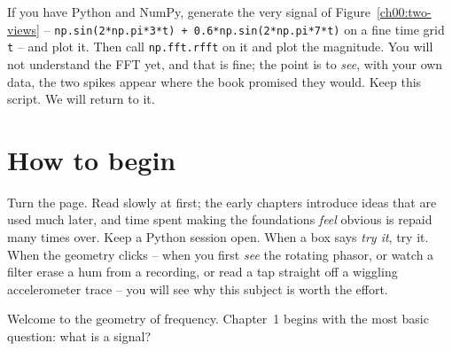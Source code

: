 \begin{exercise}
If you have Python and NumPy, generate the very signal of Figure~\ref{ch00:two-views} --
\texttt{np.sin(2*np.pi*3*t) + 0.6*np.sin(2*np.pi*7*t)} on a fine time grid \texttt{t} -- and
plot it. Then call \texttt{np.fft.rfft} on it and plot the magnitude. You will not understand
the FFT yet, and that is fine; the point is to \emph{see}, with your own data, the two spikes
appear where the book promised they would. Keep this script. We will return to it.
\end{exercise}

\section*{How to begin}

Turn the page. Read slowly at first; the early chapters introduce ideas that are used much later, and
time spent making the foundations \emph{feel} obvious is repaid many times over. Keep a Python
session open. When a box says \emph{try it}, try it. When the geometry clicks -- when you first
\emph{see} the rotating phasor, or watch a filter erase a hum from a recording, or read a tap
straight off a wiggling accelerometer trace -- you will see why this subject is worth the effort.

Welcome to the geometry of frequency. Chapter~1 begins with the most basic question: what is a signal?

